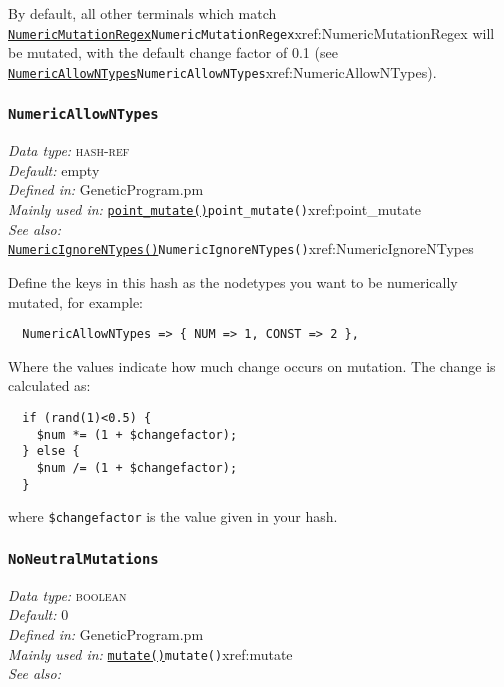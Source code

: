 \documentclass[a4paper]{article}
\begin{document}
By default, all other terminals which match
\hyperref[no]{\texttt{NumericMutationRegex}}{\texttt{NumericMutationRegex}}{xref:NumericMutationRegex} will be mutated, with the default change
factor of 0.1 (see \hyperref[no]{\texttt{NumericAllowNTypes}}{\texttt{NumericAllowNTypes}}{xref:NumericAllowNTypes}).

\subsubsection{\texttt{NumericAllowNTypes}}\label{xref:NumericAllowNTypes}
\begin{flushleft}
\textit{Data type:} \textsc{hash-ref}\\
\textit{Default:} empty\\
\textit{Defined in:} GeneticProgram.pm\\
\textit{Mainly used in:} \hyperref[no]{\texttt{point\_mutate()}}{\texttt{point\_mutate()}}{xref:point_mutate}\\
\textit{See also:} \hyperref[no]{\texttt{NumericIgnoreNTypes()}}{\texttt{NumericIgnoreNTypes()}}{xref:NumericIgnoreNTypes}
\end{flushleft}

Define the keys in this hash as the nodetypes you want to be
numerically mutated, for example:
\begin{verbatim}
  NumericAllowNTypes => { NUM => 1, CONST => 2 },
\end{verbatim}

Where the values indicate how much change occurs on mutation.
The change is calculated as:

\begin{verbatim}
  if (rand(1)<0.5) {
    $num *= (1 + $changefactor);
  } else {
    $num /= (1 + $changefactor);
  }
\end{verbatim}

\noindent where \verb:$changefactor: %
is the value given in your hash.

\subsubsection{\texttt{NoNeutralMutations}}\label{xref:NoNeutralMutations}
\begin{flushleft}
\textit{Data type:} \textsc{boolean}\\
\textit{Default:} 0\\
\textit{Defined in:} GeneticProgram.pm\\
\textit{Mainly used in:} \hyperref[no]{\texttt{mutate()}}{\texttt{mutate()}}{xref:mutate}\\
\textit{See also:}
\end{flushleft}
\end{document}
